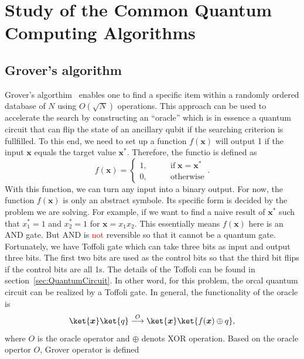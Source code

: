 \section{Study of the Common Quantum Computing Algorithms}
\subsection{Grover's algorithm}
Grover's algorthim~\cite{Abhijith2018QuantumBeginner,NielsenChuang2010,Hidary2019QCBook} enables one to find a specific item within a randomly ordered database of $N$ using $O(\sqrt{N})$ operations. This approach can be used to accelerate the search by constructing an ``oracle'' which is in essence a quantum circuit that can flip the state of an ancillary qubit if the searching criterion is fullfilled. To this end, we need to set up a function $f(\boldsymbol{x})$ will output 1 if the input $\boldsymbol{x}$ equals the target value $\boldsymbol{x^*}$. Therefore, the functio is defined as
\begin{equation}
     f(\boldsymbol{x})=\begin{cases}
        1, & \qquad \text{if} \; \boldsymbol{x}=\boldsymbol{x^*} \\
        0, & \qquad \text{otherwise}
    \end{cases}.   
\end{equation}
With this function, we can turn any input into a binary output. For now, the function $f(\boldsymbol{x})$ is only an abstract symbole. Its specific form is decided by the problem we are solving. For example, if we want to find a naive result of $\boldsymbol{x^*}$ such that $x_1^*=1$ and $x_2^*=1$ for $\boldsymbol{x}=x_1x_2$. This essentially means $f(\boldsymbol{x})$ here is an AND gate. But AND is \textcolor{red}{not} reversible so that it cannot be a quantum gate. Fortunately, we have Toffoli gate which can take three bits as input and output three bits. The first two bits are used as the control bits so that the third bit flips if the control bits are all 1s. The details of the Toffoli can be found in section~\ref{sec:QuantumCircuit}. In other word, for this problem, the orcal quantum circuit can be realized by a Toffoli gate. In general, the functionality of the oracle is 
\begin{equation}
    \ket{\boldsymbol{x}}\ket{q}\overset{O} {\longrightarrow} \ket{\boldsymbol{x}}\ket{f(\boldsymbol{x})\oplus q}, 
\end{equation}
where $O$ is the oracle operator and $\oplus$ denots XOR operation. Based on the oracle opertor $O$, Grover operator is defined
